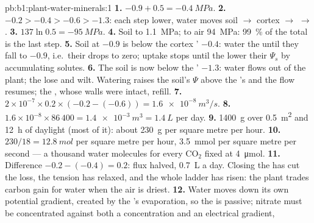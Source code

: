 \begin{solution}{pb:b1:plant-water-minerals:1}
\textbf{1.} $-0.9 + 0.5 = \qty{-0.4}{MPa}$.
\textbf{2.} $-0.2 > -0.4 > -0.6 > -1.3$: each step lower, water moves
soil $\to$ cortex $\to$  $\to$ .
\textbf{3.} $137\ln 0.5 = \qty{-95}{MPa}$.
\textbf{4.} Soil to  \qty{1.1}{MPa};  to air \qty{94}{MPa}:
\qty{99}{\%} of the total is the last step.
\textbf{5.} Soil at $-0.9$ is below the cortex ' $-0.4$: water
 the  until they fall to $-0.9$, i.e.\ their  drops
to zero; uptake stops until the  lower their $\Psi_s$ by
accumulating solutes.
\textbf{6.} The soil is now below the ' $-1.3$: water flows out
of the plant; the  lose  and wilt. Watering raises the
soil's $\Psi$ above the 's and the flow resumes; the , whose
walls were intact, refill.
\textbf{7.} $2\times 10^{-7}\times 0.2\times(-0.2 - (-0.6)) =
\qty{1.6e-8}{m^3/s}$.
\textbf{8.} $1.6\times 10^{-8}\times 86\,400 = \qty{1.4e-3}{m^3} =
\qty{1.4}{L}$ per day.
\textbf{9.} \qty{1400}{g} over \qty{0.5}{m^2} and \qty{12}{h} of daylight
(most of it): about \qty{230}{g} per square metre per hour.
\textbf{10.} $230/18 = \qty{12.8}{mol}$ per square metre per hour, \qty{3.5}{mmol} per square metre per second --- a thousand water molecules for every $\mathrm{CO_2}$ fixed at \qty{4}{\micro mol}.
\textbf{11.} Difference $-0.2 - (-0.4) = 0.2$: flux halved,
\qty{0.7}{L} a day. Closing the  has cut the loss, the tension
has relaxed, and the whole ladder has risen: the plant trades carbon
gain for water when the air is driest.
\textbf{12.} Water moves down its own potential gradient, created by
the 's evaporation, so the  is passive; nitrate must be
concentrated against both a concentration and an electrical gradient,

\end{solution}
